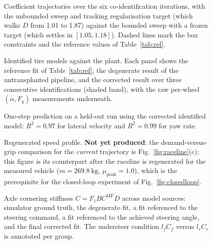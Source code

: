 \begin{figure}[t]
\centering
{}
\caption{Coefficient trajectories over the six co-identification iterations,
with the unbounded sweep and tracking regularisation target (which walks
$D$ from \num{1.01} to \num{1.87}) against the bounded sweep with a frozen
target (which settles in $[1.05,1.18]$). Dashed lines mark the box
constraints and the reference values of Table~\ref{tab:ref}.}
\label{fig:iterations}
\end{figure}

\begin{figure}[t]
\centering
{}
\caption{Identified tire models against the plant. Each panel shows the
reference fit of Table~\ref{tab:ref}, the degenerate result of the
untransplanted pipeline, and the corrected result over three consecutive
identifications (shaded band), with the raw per-wheel
$(\alpha,F_{y})$ measurements underneath.}
\label{fig:tirecurves}
\end{figure}

\begin{figure}[t]
\centering
{}
\caption{One-step prediction on a held-out run using the corrected identified
model: $R^{2}=\num{0.97}$ for lateral velocity and $R^{2}=\num{0.99}$ for yaw
rate.}
\label{fig:onestep}
\end{figure}

\begin{figure}[t]
\centering
{}
\caption{Regenerated speed profile. \textbf{Not yet produced}: the
demand-versus-grip comparison for the \emph{current} trajectory is
Fig.~\ref{fig:raceline}(c); this figure is its counterpart after the raceline
is regenerated for the measured vehicle ($m=\SI{269.8}{\kilo\gram}$,
$\mu_{\mathrm{peak}}=1.0$), which is the prerequisite for the closed-loop
experiment of Fig.~\ref{fig:closedloop}.}
\label{fig:demand}
\end{figure}

\begin{figure}[t]
\centering
{}
\caption{Axle cornering stiffness $C=F_{z}BC^{\mathrm{MF}}D$ across model
sources: simulator ground truth, the degenerate fit, a fit referenced to the
steering command, a fit referenced to the achieved steering angle, and the
final corrected fit. The understeer condition $l_{f}C_{f}$ versus
$l_{r}C_{r}$ is annotated per group.}
\label{fig:stiffness}
\end{figure}

